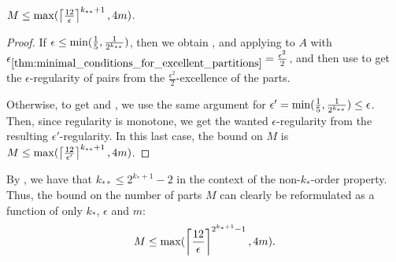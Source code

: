 \begin{theorem}
\begin{enumerate}[label={\Roman*}., ref={\Roman*}, font=\rmfamily]
                    $M \leq \max ( \left\lceil \frac{12}{\epsilon} \right\rceil^{k_{**}+1}, 4m )$.
            \end{enumerate}
            \begin{proof}
                If $\epsilon \leq \min ( \frac{1}{5}, \frac{1}{2^{k_{**}}} )$, then we obtain ,
                 and  applying
                 to $A$ with
                $\epsilon_{\ref{thm:minimal_conditions_for_excellent_partitions}} = \frac{\epsilon^2}{2}$, and then use
                 to get the $\epsilon$-regularity of pairs from the $\frac{\epsilon^2}{2}$-excellence
                of the parts.

                Otherwise, to get  and ,
                we use the same argument for $\epsilon' = \min ( \frac{1}{5}, \frac{1}{2^{k_{**}}} ) \leq \epsilon$.
                Then, since regularity is monotone, we get the wanted $\epsilon$-regularity from the resulting $\epsilon'$-regularity.
                In this last case, the bound on $M$ is $M \leq \max ( \left\lceil \frac{12}{\epsilon'} \right\rceil^{k_{**}+1}, 4m )$.
            \end{proof}
        \end{theorem}

        \begin{remark}
            By , we have that $k_{**} \leq 2^{k_* + 1}-2$ in the context of the non-$k_*$-order
            property.
            Thus, the bound on the number of parts $M$ can clearly be reformulated as a function of only $k_*$, $\epsilon$ and $m$:
            \[
                M \leq \max ( \left\lceil \frac{12}{\epsilon} \right\rceil^{2^{k_* + 1}-1}, 4m ).
            \]
        \end{remark}





